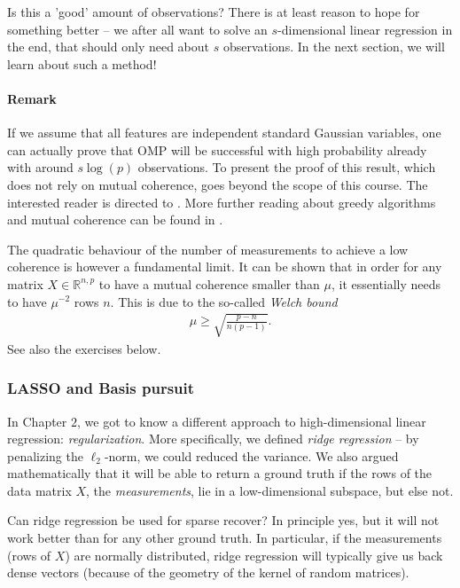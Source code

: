 \documentclass{article}
\newcommand{\R}{\mathbb{R}}
\begin{document}
Is this a 'good' amount of observations? There is at least reason to hope for something better -- we after all want to solve an $s$-dimensional linear regression in the end, that should only need about $s$ observations. In the next section, we will learn about such a method!

\paragraph{Remark} If we assume that all features are independent standard Gaussian variables, one can actually prove that OMP will be successful with high probability already with around $s\log(p)$ observations. To present the proof of this result, which does not rely on mutual coherence, goes beyond the scope of this course. The interested reader is directed to \cite{tropp2007signal}. More further reading about greedy algorithms and mutual coherence can be found in \cite[Ch.3,5]{FouRau2013}.

The quadratic behaviour of the number of measurements to achieve a low coherence is however a fundamental limit. It can be shown that in order for any matrix $X\in \R^{n,p}$ to have a mutual coherence smaller than $\mu$, it essentially needs to have $\mu^{-2}$ rows $n$. This is due to the so-called \emph{Welch bound} \cite{WelchBound}
\begin{align*}
    \mu \geq \sqrt{\frac{p-n}{n(p-1)}}.
\end{align*}
See also the exercises below.

\subsubsection{LASSO and Basis pursuit}
In Chapter $2$, we got to know a different approach to high-dimensional linear regression: \emph{regularization}. More specifically, we defined \emph{ridge regression} -- by penalizing the $\ell_2$-norm, we could reduced the variance. We also argued mathematically that it will be able to return a ground truth if the rows of the data matrix $X$, the \emph{measurements}, lie in a low-dimensional subspace, but else not.

Can ridge regression be used for sparse recover? In principle yes, but it will not work better than for any other ground truth. In particular, if the measurements (rows of $X$) are normally distributed, ridge regression will typically give us back dense vectors (because of the geometry of the kernel of random matrices). 
\end{document}
